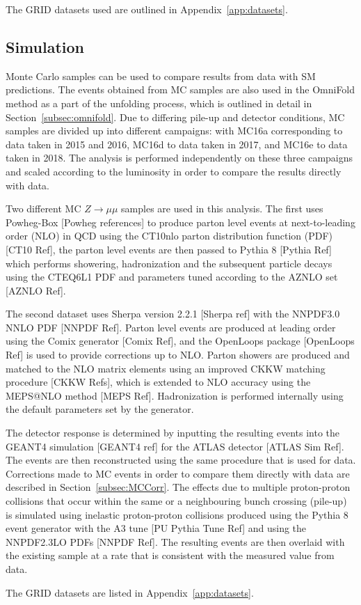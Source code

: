 The GRID datasets used are outlined in Appendix~\ref{app:datasets}.

\subsection{Simulation}
Monte Carlo samples can be used to compare results from data with SM predictions. The events obtained from MC samples are also used in the OmniFold method as a part of the unfolding process, which is outlined in detail in Section~\ref{subsec:omnifold}.
Due to differing pile-up and detector conditions, MC samples are divided up into different campaigns: with MC16a corresponding to data taken in 2015 and 2016, MC16d to data taken in 2017, and MC16e to data taken in 2018. The analysis is performed independently
on these three campaigns and scaled according to the luminosity in order to compare the results directly with data.

Two different MC $Z\rightarrow\mu\mu$ samples are used in this analysis. The first uses Powheg-Box [Powheg references] to produce parton level events at next-to-leading order (NLO) in QCD using the CT10nlo parton distribution function (PDF) [CT10 Ref], the parton level events are
then passed to Pythia 8 [Pythia Ref] which performs showering, hadronization and the subsequent particle decays using the CTEQ6L1 PDF and parameters tuned according to the AZNLO set [AZNLO Ref].

The second dataset uses Sherpa version 2.2.1 [Sherpa ref] with the NNPDF3.0 NNLO PDF [NNPDF Ref]. Parton level events are produced at leading order using the Comix generator [Comix Ref], and the OpenLoops package [OpenLoops Ref] is used to provide corrections up to NLO.
Parton showers are produced and matched to the NLO matrix elements using an improved CKKW matching procedure [CKKW Refs], which is extended to NLO accuracy using the MEPS@NLO method [MEPS Ref]. Hadronization is performed internally using the default parameters set by the generator.

The detector response is determined by inputting the resulting events into the GEANT4 simulation [GEANT4 ref] for the ATLAS detector [ATLAS Sim Ref]. The events are then reconstructed using the same procedure that is used for data. Corrections made to MC events in order to compare them directly with data are described in Section~\ref{subsec:MCCorr}.
The effects due to multiple proton-proton collisions that occur within the same or a neighbouring bunch crossing (pile-up) is simulated using inelastic proton-proton collisions produced using the Pythia 8 event generator with the A3 tune [PU Pythia Tune Ref] and using the NNPDF2.3LO PDFs [NNPDF Ref]. The resulting events are
then overlaid with the existing sample at a rate that is consistent with the measured value from data.

The GRID datasets are listed in Appendix~\ref{app:datasets}.
